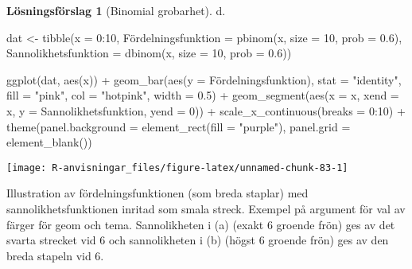 \documentclass[
]{book}
\newenvironment{Shaded}{\begin{snugshade}}{\end{snugshade}}
\newcommand{\AttributeTok}[1]{\textcolor[rgb]{0.77,0.63,0.00}{#1}}
\newcommand{\DecValTok}[1]{\textcolor[rgb]{0.00,0.00,0.81}{#1}}
\newcommand{\FloatTok}[1]{\textcolor[rgb]{0.00,0.00,0.81}{#1}}
\newcommand{\FunctionTok}[1]{\textcolor[rgb]{0.00,0.00,0.00}{#1}}
\newcommand{\NormalTok}[1]{#1}
\newcommand{\OtherTok}[1]{\textcolor[rgb]{0.56,0.35,0.01}{#1}}
\newcommand{\SpecialCharTok}[1]{\textcolor[rgb]{0.00,0.00,0.00}{#1}}
\newcommand{\StringTok}[1]{\textcolor[rgb]{0.31,0.60,0.02}{#1}}
\theoremstyle{definition}
\theoremstyle{definition}
\theoremstyle{definition}
\theoremstyle{definition}
\newtheorem{hypothesis}{Lösningsförslag}[chapter]
\theoremstyle{remark}
\begin{document}
\begin{hypothesis}[Binomial grobarhet]
d.

\begin{Shaded}
\begin{Highlighting}[]
\NormalTok{dat }\OtherTok{\textless{}{-}} \FunctionTok{tibble}\NormalTok{(}\AttributeTok{x =} \DecValTok{0}\SpecialCharTok{:}\DecValTok{10}\NormalTok{,}
\NormalTok{       Fördelningsfunktion }\OtherTok{=} \FunctionTok{pbinom}\NormalTok{(x, }\AttributeTok{size =} \DecValTok{10}\NormalTok{, }\AttributeTok{prob =} \FloatTok{0.6}\NormalTok{),}
       \AttributeTok{Sannolikhetsfunktion =} \FunctionTok{dbinom}\NormalTok{(x, }\AttributeTok{size =} \DecValTok{10}\NormalTok{, }\AttributeTok{prob =} \FloatTok{0.6}\NormalTok{))}

\FunctionTok{ggplot}\NormalTok{(dat, }\FunctionTok{aes}\NormalTok{(x)) }\SpecialCharTok{+}
  \FunctionTok{geom\_bar}\NormalTok{(}\FunctionTok{aes}\NormalTok{(}\AttributeTok{y =}\NormalTok{ Fördelningsfunktion), }\AttributeTok{stat =} \StringTok{"identity"}\NormalTok{, }
           \AttributeTok{fill =} \StringTok{"pink"}\NormalTok{, }\AttributeTok{col =} \StringTok{"hotpink"}\NormalTok{, }\AttributeTok{width =} \FloatTok{0.5}\NormalTok{) }\SpecialCharTok{+}
  \FunctionTok{geom\_segment}\NormalTok{(}\FunctionTok{aes}\NormalTok{(}\AttributeTok{x =}\NormalTok{ x, }\AttributeTok{xend =}\NormalTok{ x, }
                   \AttributeTok{y =}\NormalTok{ Sannolikhetsfunktion, }\AttributeTok{yend =} \DecValTok{0}\NormalTok{)) }\SpecialCharTok{+}
  \FunctionTok{scale\_x\_continuous}\NormalTok{(}\AttributeTok{breaks =} \DecValTok{0}\SpecialCharTok{:}\DecValTok{10}\NormalTok{) }\SpecialCharTok{+}
  \FunctionTok{theme}\NormalTok{(}\AttributeTok{panel.background =} \FunctionTok{element\_rect}\NormalTok{(}\AttributeTok{fill =} \StringTok{"purple"}\NormalTok{), }
        \AttributeTok{panel.grid =} \FunctionTok{element\_blank}\NormalTok{())}
\end{Highlighting}
\end{Shaded}

\begin{center}\texttt{[image: R-anvisningar\_files/figure-latex/unnamed-chunk-83-1]} \end{center}

Illustration av fördelningsfunktionen (som breda staplar) med sannolikhetsfunktionen inritad som smala streck. Exempel på argument för val av färger för geom och tema. Sannolikheten i (a) (exakt 6 groende frön) ges av det svarta strecket vid 6 och sannolikheten i (b) (högst 6 groende frön) ges av den breda stapeln vid 6.
\end{hypothesis}
\end{document}
